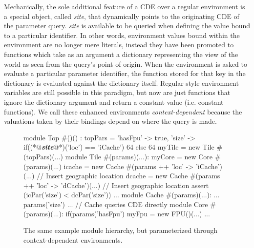 Mechanically, the sole additional feature of a CDE over a regular environment is a special object, called \emph{site}, that dynamically points to the originating CDE of the parameter query.
\emph{site} is available to be queried when defining the value bound to a particular identifier.
In other words, environment values bound within the environment are no longer mere literals, instead
they have been promoted to functions which take as an argument a dictionary representing the view of the world as seen from the query's point of origin.
When the environment is asked to evaluate a particular parameter identifier, the function stored for that key in the dictionary is evaluated against the dictionary itself.
Regular style environment variables are still possible in this paradigm, but now are just functions that ignore the dictionary argument and return a constant value (i.e. constant functions). 
We call these enhanced environments {\em context-dependent} because the valuations taken by their bindings depend on where the query is made.

\begin{figure}
\centering
\begin{phdl}
module Top #()() :
  topPars = {'hasFpu' -> true,
             'size' -> if((*@\textcolor[rgb]{1,0.5,0}{\textbf{\textit{site}}}@*)('loc') == 'iCache') 64 else 64 }
  myTile = new Tile #(topPars)(...)
module Tile #(params)(...):
  myCore = new Core #(params)(...)
  icache = new Cache #(params ++ {'loc' -> 'iCache'})(...) // Insert geographic location
  dcache = new Cache #(params ++ {'loc' -> 'dCache'})(...) // Insert geographic location
  assert (icPar('size') < dcPar('size')) ...
module Cache #(params)(...):
  ... params('size') ... // Cache queries CDE directly
module Core #(params)(...):
  if(params('hasFpu') myFpu = new FPU()(...) ...
\end{phdl} 
\caption{The same example module hierarchy, but parameterized through context-dependent environments.}
\label{fig:cde}
\end{figure}

